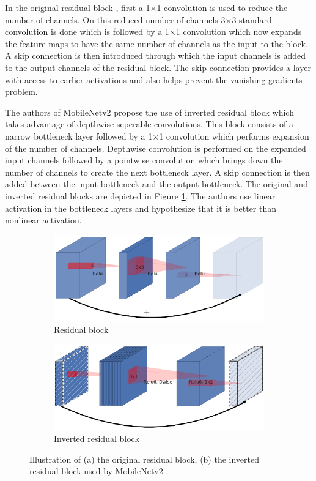 In the original residual block \cite{DBLP:journals/corr/HeZRS15}, first a 1$\times$1 convolution is used to reduce the number of channels. On this reduced number of channels 3$\times$3 standard convolution is done which is followed by a 1$\times$1 convolution which now expands the feature maps to have the same number of channels as the input to the block. A skip connection is then introduced through which the input channels is added to the output channels of the residual block. The skip connection provides a layer with access to earlier activations and also helps prevent the vanishing gradients problem. 

The authors of MobileNetv2 propose the use of inverted residual block which takes advantage of depthwise seperable convolutions. This block consists of a narrow bottleneck layer followed by a 1$\times$1 convolution which performs expansion of the number of channels. Depthwise convolution is performed on the expanded input channels followed by a pointwise convolution which brings down the number of channels to create the next bottleneck layer. A skip connection is then added between the input bottleneck and the output bottleneck. The original and inverted residual blocks are depicted in Figure \ref{Fig:residual}. The authors use linear activation in the bottleneck layers and hypothesize that it is better than nonlinear activation.

	\begin{figure}
		\begin{subfigure}{.5\textwidth}
			\centering
			\includegraphics[width=.8\linewidth]{images/residual}
			\caption{Residual block}
		\end{subfigure}
		\begin{subfigure}{.5\textwidth}
			\centering
			\includegraphics[width=.8\linewidth]{images/inverted_residual}
			\caption{Inverted residual block}
		\end{subfigure}
		\caption{Illustration of (a) the original residual block, (b) the inverted residual block used by MobileNetv2 \cite{DBLP:journals/corr/abs-1801-04381}.}
		\label{Fig:residual}
	\end{figure}

